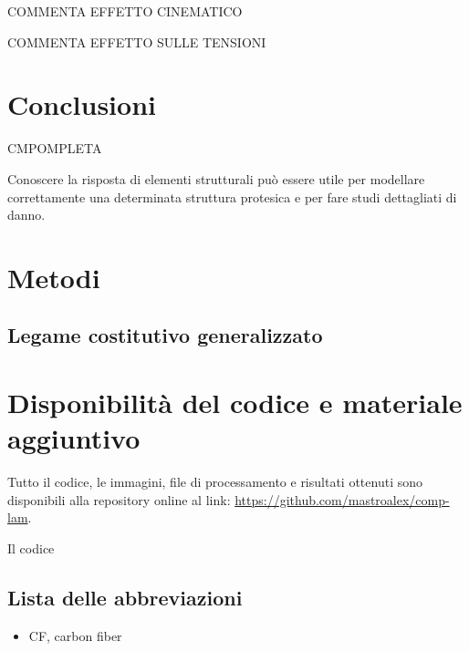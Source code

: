 \documentclass[a4paper,num-refs]{oup-contemporary}
\begin{document}
COMMENTA EFFETTO CINEMATICO

COMMENTA EFFETTO SULLE TENSIONI 

\textcolor{blue}{\lipsum[1-2]}


\section{Conclusioni}


CMPOMPLETA

Conoscere la risposta di elementi strutturali può essere utile per modellare correttamente una determinata struttura protesica e per fare studi dettagliati  di danno.

\textcolor{blue}{\lipsum[1-2]}

\section{Metodi}

\subsection{Legame costitutivo generalizzato}

\textcolor{blue}{\lipsum[1-2]}


\section{Disponibilità del codice e materiale aggiuntivo}

Tutto il codice, le immagini, file di processamento e risultati ottenuti sono disponibili alla repository online al link: \url{https://github.com/mastroalex/comp-lam}. 

Il codice 


\subsection{Lista delle abbreviazioni}

\begin{itemize}
	\item CF, carbon fiber
\end{itemize}
 



\newpage

\end{document}
